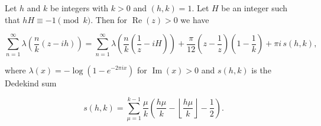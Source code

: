 Let $h$ and $k$ be integers with $k > 0$ and $(h, k) = 1$. Let $H$ be an integer such that $hH \equiv -1 \pmod{k}$. Then for $\operatorname{Re}(z) > 0$ we have

$$\sum_{n=1}^{\infty} \lambda\!\left(\frac{n}{k}(z - ih)\right) = \sum_{n=1}^{\infty} \lambda\!\left(\frac{n}{k}\!\left(\frac{1}{z} - iH\right)\right) + \frac{\pi}{12}\!\left(z - \frac{1}{z}\right)\!\left(1 - \frac{1}{k}\right) + \pi i\, s(h, k),$$

where $\lambda(x) = -\log(1 - e^{-2\pi i x})$ for $\operatorname{Im}(x) > 0$ and $s(h, k)$ is the Dedekind sum

$$s(h, k) = \sum_{\mu=1}^{k-1} \frac{\mu}{k}\!\left(\frac{h\mu}{k} - \left\lfloor\frac{h\mu}{k}\right\rfloor - \frac{1}{2}\right).$$
